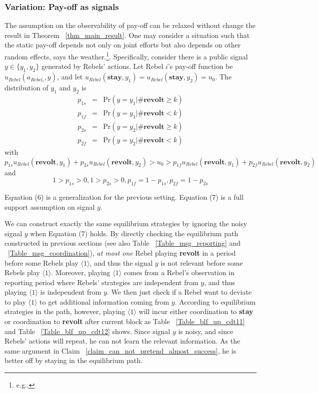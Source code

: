 \documentclass[12pt,letter]{article}
\theoremstyle{definition}
\theoremstyle{remark}
\theoremstyle{claim}
\begin{document}
\subsubsection{Variation: Pay-off as signals}
The assumption on the observability of pay-off can be relaxed without change the result in Theorem ~\ref{thm_main_result}. One may consider a situation such that the static pay-off depends not only on joint efforts but also depends on other random effects, says the weather.\footnote{e.g.,\citep{SHADMEHR2011}}. Specifically, consider there is a public signal $y\in \{y_1,y_2\}$ generated by Rebels' actions. Let Rebel $i$'s pay-off function be $u_{Rebel}(a_{Rebel_i},y)$, and let $u_{Rebel}(\textbf{stay},y_1)=u_{Rebel}(\textbf{stay},y_2)=u_0$. The distribution of $y_1$ and $y_2$ is 
\begin{eqnarray*}
p_{1s} &=& \mathrm {Pr}(y=y_1|\#\textbf{revolt}\geq k) \\
p_{1f} &=& \mathrm {Pr}(y=y_1|\#\textbf{revolt}< k) \\
p_{2s} &=& \mathrm {Pr}(y=y_2|\#\textbf{revolt}\geq k) \\
p_{2f} &=& \mathrm {Pr}(y=y_2|\#\textbf{revolt}< k) 
\end{eqnarray*}
with
\begin{equation}
p_{1s}u_{Rebel}(\textbf{revolt}, y_1)+p_{2s}u_{Rebel}(\textbf{revolt}, y_2)>u_0>p_{1f}u_{Rebel}(\textbf{revolt}, y_1)+p_{2f}u_{Rebel}(\textbf{revolt}, y_2)
\end{equation}
and
\begin{equation}
1>p_{1s}>0,1>p_{2s}>0,p_{1f}=1-p_{1s},p_{2f}=1-p_{2s}
\end{equation}

Equation (6) is a generalization for the previous setting. Equation (7) is a full support assumption on signal $y$. 

We can construct exactly the same equilibrium strategies by ignoring the noisy signal $y$ when Equation (7) holds. By directly checking the equilibrium path constructed in previous sections (see also Table ~\ref{Table_msg_reporting} and ~\ref{Table_msg_coordination}), \textit{at most one} Rebel playing \textbf{revolt} in a period before some Rebels play $\langle 1 \rangle$, and thus the signal $y$ is not relevant before some Rebels play $\langle 1 \rangle$. Moreover, playing $\langle 1 \rangle$ comes from a Rebel's observation in reporting period where Rebels' strategies are independent from $y$, and thus playing $\langle 1 \rangle$ is independent from $y$. We then just check if a Rebel want to deviate to play $\langle 1 \rangle$ to get additional information coming from $y$. According to equilibrium strategies in the path, however, playing $\langle 1 \rangle$ will incur either coordination to \textbf{stay} or coordination to \textbf{revolt} after current block as Table ~\ref{Table_blf_up_cdt11} and Table ~\ref{Table_blf_up_cdt12} shows. Since signal $y$ is noisy, and since Rebels' actions will repeat, he can not learn the relevant information. As the same argument in Claim ~\ref{claim_can_not_pretend_almost_success}, he is better off by staying in the equilibrium path.
\end{document}
